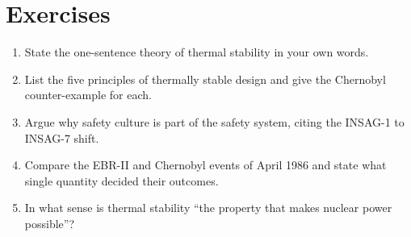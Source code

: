 \section*{Exercises}
\begin{enumerate}[leftmargin=*,itemsep=2pt]
\item State the one-sentence theory of thermal stability in your own words.
\item List the five principles of thermally stable design and give the Chernobyl counter-example for each.
\item Argue why safety culture is part of the safety system, citing the INSAG-1 to INSAG-7 shift.
\item Compare the EBR-II and Chernobyl events of April 1986 and state what single quantity decided their outcomes.
\item In what sense is thermal stability ``the property that makes nuclear power possible''?
\end{enumerate}
